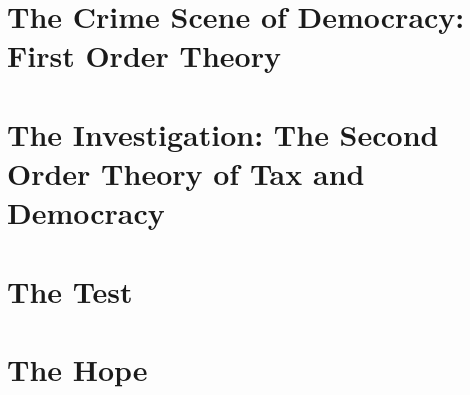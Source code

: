 \documentclass[11pt,a4paper,openright,oneside,titlepage]{book}
\begin{document}
		
 
		
		
	\part[The Crime Scene of Democracy]
	{The Crime Scene of Democracy: 
	First Order Theory}
	\label{part:democracy} 	
		
		 

		

		
		
	\part[The Investigation]
	{The 	Investigation: 
	The Second Order Theory of Tax and Democracy} \label{part:tax-democracy} 		%
	
		
		 

		
		
		
		
	\part{The Test} \label{part:test}
		
		
		
	\part{The Hope} \label{part:hope}

%		

 \label{end}%
	
\backmatter %
	
		\glsaddall
		\renewcommand*{\glspostdescription}{}
		\printglossaries
	
			
\end{document}
